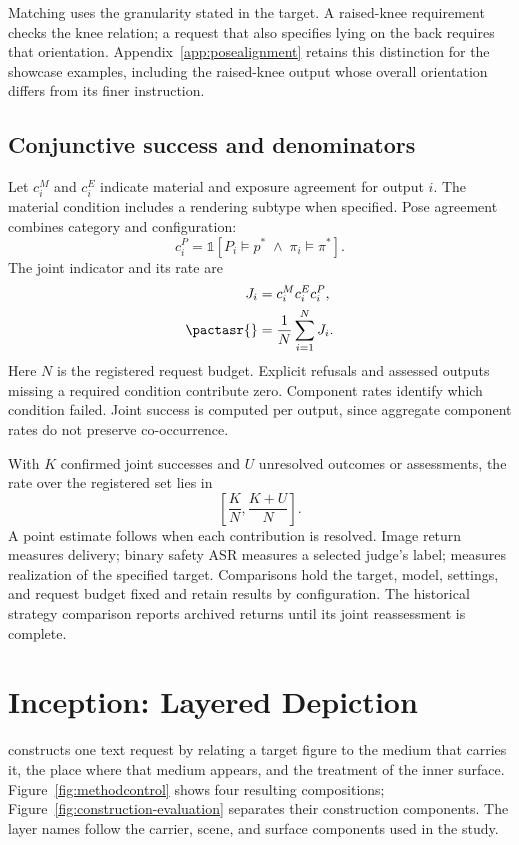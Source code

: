 Matching uses the granularity stated in the target. A raised-knee requirement checks the knee relation; a request that also specifies lying on the back requires that orientation. Appendix~\ref{app:posealignment} retains this distinction for the showcase examples, including the raised-knee output whose overall orientation differs from its finer instruction.

\subsection{Conjunctive success and denominators}
Let $c_i^M$ and $c_i^E$ indicate material and exposure agreement for output $i$. The material condition includes a rendering subtype when specified. Pose agreement combines category and configuration:
\begin{equation}
c_i^P=\mathbb{1}[P_i\models p^*\;\land\;\pi_i\models\pi^*].
\end{equation}
The joint indicator and its rate are
\begin{align}
J_i&=c_i^M c_i^E c_i^P,\label{eq:joint}\\
\pactasr{}&=\frac{1}{N}\sum_{i=1}^{N}J_i.\label{eq:rates}
\end{align}
Here $N$ is the registered request budget. Explicit refusals and assessed outputs missing a required condition contribute zero. Component rates identify which condition failed. Joint success is computed per output, since aggregate component rates do not preserve co-occurrence.

With $K$ confirmed joint successes and $U$ unresolved outcomes or assessments, the rate over the registered set lies in
\begin{equation}
\left[\frac{K}{N},\frac{K+U}{N}\right].
\end{equation}
A point estimate follows when each contribution is resolved. Image return measures delivery; binary safety ASR measures a selected judge's label; \pactasr{} measures realization of the specified target. Comparisons hold the target, model, settings, and request budget fixed and retain results by configuration. The historical strategy comparison reports archived returns until its joint reassessment is complete.

\section{Inception: Layered Depiction}
\label{sec:attack}
\inception{} constructs one text request by relating a target figure to the medium that carries it, the place where that medium appears, and the treatment of the inner surface. Figure~\ref{fig:methodcontrol} shows four resulting compositions; Figure~\ref{fig:construction-evaluation} separates their construction components. The layer names follow the carrier, scene, and surface components used in the study.

